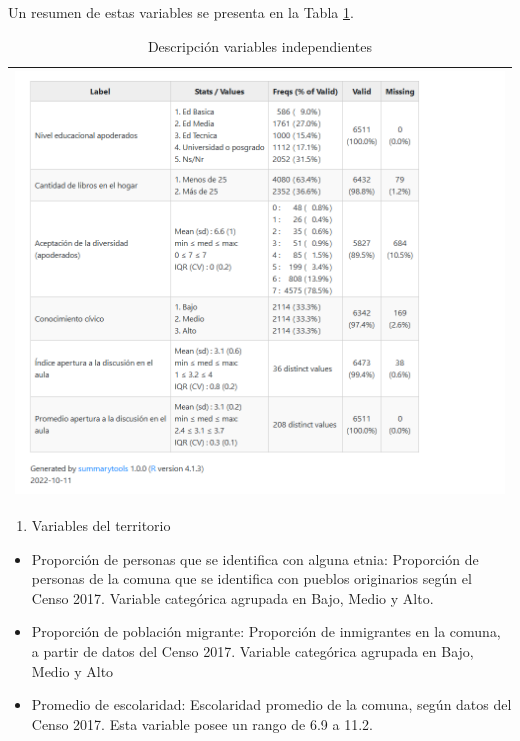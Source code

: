 \documentclass[12pt,twoside]{templates/facsothesis}
\providecommand{\tightlist}{%
  \setlength{\itemsep}{0pt}\setlength{\parskip}{0pt}}
\begin{document}
Un resumen de estas variables se presenta en la Tabla \ref{tab:desc02}.

\begin{longtable}[]{@{}l@{}}
\caption{\label{tab:desc02}Descripción variables independientes}\tabularnewline
\toprule()
\endhead
\includegraphics{IPO/output/tables/desc02.png} \\
\bottomrule()
\end{longtable}

\begin{enumerate}
\def\labelenumi{\arabic{enumi})}
\setcounter{enumi}{2}
\tightlist
\item
  Variables del territorio
\end{enumerate}

\begin{itemize}
\item
  Proporción de personas que se identifica con alguna etnia: Proporción de personas de la comuna que se identifica con pueblos originarios según el Censo 2017. Variable categórica agrupada en Bajo, Medio y Alto.
\item
  Proporción de población migrante: Proporción de inmigrantes en la comuna, a partir de datos del Censo 2017. Variable categórica agrupada en Bajo, Medio y Alto
\item
  Promedio de escolaridad: Escolaridad promedio de la comuna, según datos del Censo 2017. Esta variable posee un rango de 6.9 a 11.2.
\end{itemize}
\end{document}

